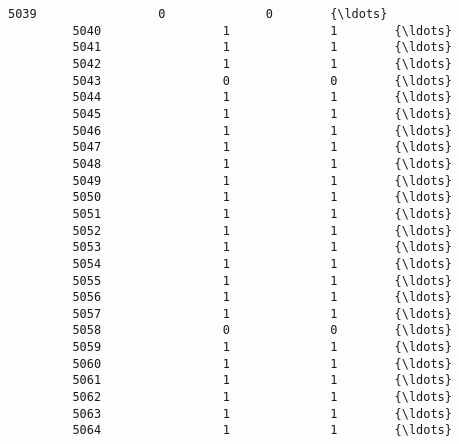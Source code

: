 \documentclass[11pt]{article}
\begin{document}
\begin{Verbatim}[commandchars=\\\{\}]
         5039                 0              0        {\ldots}          
         5040                 1              1        {\ldots}          
         5041                 1              1        {\ldots}          
         5042                 1              1        {\ldots}          
         5043                 0              0        {\ldots}          
         5044                 1              1        {\ldots}          
         5045                 1              1        {\ldots}          
         5046                 1              1        {\ldots}          
         5047                 1              1        {\ldots}          
         5048                 1              1        {\ldots}          
         5049                 1              1        {\ldots}          
         5050                 1              1        {\ldots}          
         5051                 1              1        {\ldots}          
         5052                 1              1        {\ldots}          
         5053                 1              1        {\ldots}          
         5054                 1              1        {\ldots}          
         5055                 1              1        {\ldots}          
         5056                 1              1        {\ldots}          
         5057                 1              1        {\ldots}          
         5058                 0              0        {\ldots}          
         5059                 1              1        {\ldots}          
         5060                 1              1        {\ldots}          
         5061                 1              1        {\ldots}          
         5062                 1              1        {\ldots}          
         5063                 1              1        {\ldots}          
         5064                 1              1        {\ldots}          
         

\end{Verbatim}
\end{document}
